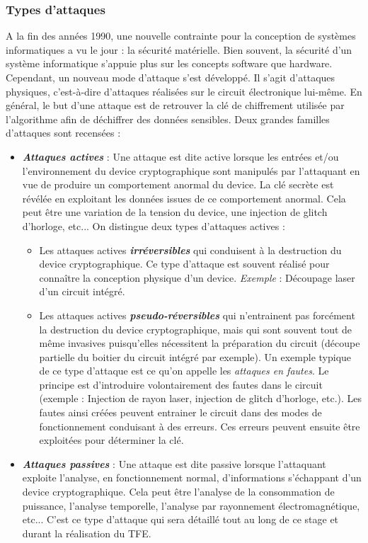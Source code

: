 \documentclass[10pt, oneside, a4paper]{article}
\begin{document}
\subsubsection{Types d'attaques}

\vspace{-0.1 cm}A la fin des années 1990, une nouvelle contrainte pour la conception de systèmes informatiques a vu le jour : la sécurité matérielle. Bien souvent, la sécurité d'un système informatique s'appuie plus sur les concepts software que hardware. Cependant, un nouveau mode d'attaque s'est développé. Il s'agit d'attaques physiques, c'est-à-dire d'attaques réalisées sur le circuit électronique lui-même. En général, le but d'une attaque est de retrouver la clé de chiffrement utilisée par l'algorithme afin de déchiffrer des données sensibles. Deux grandes familles d'attaques sont recensées : 
\begin{itemize}
\item \textbf{\textit{Attaques actives}} : Une attaque est dite active lorsque les entrées et/ou l'environnement du device cryptographique sont manipulés par l'attaquant en vue de produire un comportement anormal du device. La clé secrète est révélée en exploitant les données issues de ce comportement anormal. Cela peut être une variation de la tension du device, une injection de glitch d'horloge, etc... On distingue deux types d'attaques actives : 
\begin{itemize}
\item Les attaques actives \textbf{\textit{irréversibles}} qui conduisent à la destruction du device cryptographique. Ce type d'attaque est souvent réalisé pour connaître la conception physique d'un device. \textit{Exemple} : Découpage laser d’un circuit intégré.
\item Les attaques actives \textbf{\textit{pseudo-réversibles}} qui n’entrainent pas forcément la destruction du device cryptographique, mais qui sont souvent tout de même invasives puisqu’elles nécessitent la préparation du circuit (découpe partielle du boitier du circuit intégré par exemple). Un exemple typique de ce type d'attaque est ce qu'on appelle les \textit{attaques en fautes}. Le principe est d'introduire volontairement des fautes dans le circuit (exemple : Injection de rayon laser, injection de glitch d’horloge, etc.). Les fautes ainsi créées peuvent entrainer le circuit dans des modes de fonctionnement conduisant à des erreurs. Ces erreurs peuvent ensuite être exploitées pour déterminer la clé.
\end{itemize}
\item \textbf{\textit{Attaques passives}} : Une attaque est dite passive lorsque l'attaquant exploite l'analyse, en fonctionnement normal, d'informations s'échappant d'un device cryptographique. Cela peut être l'analyse de la consommation de puissance, l'analyse temporelle, l'analyse par rayonnement électromagnétique, etc... C'est ce type d'attaque qui sera détaillé tout au long de ce stage et durant la réalisation du TFE. \\
\end{itemize}
\end{document}
